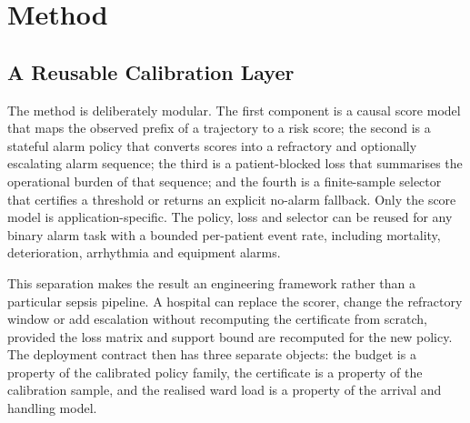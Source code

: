 \section{Method}
\label{sec:method}

\subsection{A Reusable Calibration Layer}
\label{sec:framework}

The method is deliberately modular. The first component is a causal score model that maps the observed prefix of a trajectory to a risk score; the second is a stateful alarm policy that converts scores into a refractory and optionally escalating alarm sequence; the third is a patient-blocked loss that summarises the operational burden of that sequence; and the fourth is a finite-sample selector that certifies a threshold or returns an explicit no-alarm fallback. Only the score model is application-specific. The policy, loss and selector can be reused for any binary alarm task with a bounded per-patient event rate, including mortality, deterioration, arrhythmia and equipment alarms.

This separation makes the result an engineering framework rather than a particular sepsis pipeline. A hospital can replace the scorer, change the refractory window or add escalation without recomputing the certificate from scratch, provided the loss matrix and support bound are recomputed for the new policy. The deployment contract then has three separate objects: the budget is a property of the calibrated policy family, the certificate is a property of the calibration sample, and the realised ward load is a property of the arrival and handling model.




